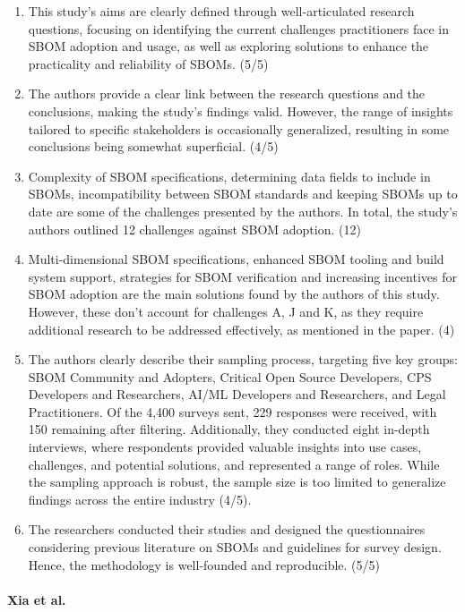 \begin{enumerate}
    \item This study's aims are clearly defined through well-articulated research questions, focusing on identifying the current challenges practitioners face in SBOM adoption and usage, as well as exploring solutions to enhance the practicality and reliability of SBOMs. (5/5)
    \item The authors provide a clear link between the research questions and the conclusions, making the study's findings valid. However, the range of insights tailored to specific stakeholders is occasionally generalized, resulting in some conclusions being somewhat superficial. (4/5)
    \item Complexity of SBOM specifications, determining data fields to include in SBOMs, incompatibility between SBOM standards and keeping SBOMs up to date are some of the challenges presented by the authors. In total, the study's authors outlined 12 challenges against SBOM adoption. (12)
    \item Multi-dimensional SBOM specifications, enhanced SBOM tooling and build system support, strategies for SBOM verification and increasing incentives for SBOM adoption are the main solutions found by the authors of this study. However, these don't account for challenges A, J and K, as they require additional research to be addressed effectively, as mentioned in the paper. (4)
    \item The authors clearly describe their sampling process, targeting five key groups: SBOM Community and Adopters, Critical Open Source Developers, CPS Developers and Researchers, AI/ML Developers and Researchers, and Legal Practitioners. Of the 4,400 surveys sent, 229 responses were received, with 150 remaining after filtering. Additionally, they conducted eight in-depth interviews, where respondents provided valuable insights into use cases, challenges, and potential solutions, and represented a range of roles. While the sampling approach is robust, the sample size is too limited to generalize findings across the entire industry (4/5).
    \item The researchers conducted their studies and designed the questionnaires considering previous literature on SBOMs and guidelines for survey design. Hence, the methodology is well-founded and reproducible. (5/5)
\end{enumerate}

\paragraph{Xia et al. \cite{article:sbom-study}}


